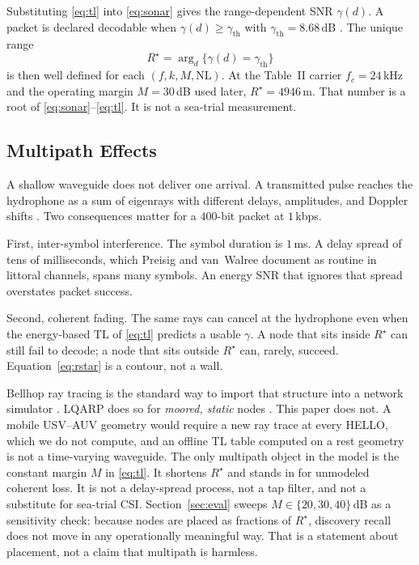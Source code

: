 \documentclass[journal]{IEEEtran}
\begin{document}
Substituting \eqref{eq:tl} into \eqref{eq:sonar} gives the
range-dependent SNR $\gamma(d)$.
A packet is declared decodable when
$\gamma(d)\ge\gamma_{\mathrm{th}}$ with
$\gamma_{\mathrm{th}}=8.68$\,dB \cite{liu2026lqarp}.
The unique range
\begin{equation}
R^{\star}=\arg_{d}\bigl\{\gamma(d)=\gamma_{\mathrm{th}}\bigr\}
\label{eq:rstar}
\end{equation}
is then well defined for each $(f,k,M,\mathrm{NL})$.
At the Table~II carrier $f_{c}=24$\,kHz and the operating margin
$M=30$\,dB used later, $R^{\star}=4946$\,m.
That number is a root of \eqref{eq:sonar}--\eqref{eq:tl}. It is not
a sea-trial measurement.

\subsection{Multipath Effects}
\label{sec:multipath}

A shallow waveguide does not deliver one arrival.
A transmitted pulse reaches the hydrophone as a sum of eigenrays
with different delays, amplitudes, and Doppler shifts
\cite{preisig2007propagation,vanwalree2013scattering}.
Two consequences matter for a $400$-bit packet at $1$\,kbps.

First, inter-symbol interference.
The symbol duration is $1$\,ms. A delay spread of tens of
milliseconds, which Preisig and van~Walree document as routine in
littoral channels, spans many symbols.
An energy SNR that ignores that spread overstates packet success.

Second, coherent fading.
The same rays can cancel at the hydrophone even when the
energy-based $\mathrm{TL}$ of \eqref{eq:tl} predicts a usable
$\gamma$. A node that sits inside $R^{\star}$ can still fail to
decode; a node that sits outside $R^{\star}$ can, rarely, succeed.
Equation~\eqref{eq:rstar} is a contour, not a wall.

Bellhop ray tracing is the standard way to import that structure
into a network simulator \cite{porter2011bellhop}.
LQARP does so for \emph{moored, static} nodes \cite{liu2026lqarp}.
This paper does not.
A mobile USV--AUV geometry would require a new ray trace at every
HELLO, which we do not compute, and an offline TL table computed on
a rest geometry is not a time-varying waveguide.
The only multipath object in the model is the constant margin $M$
in \eqref{eq:tl}.
It shortens $R^{\star}$ and stands in for unmodeled coherent loss.
It is not a delay-spread process, not a tap filter, and not a
substitute for sea-trial CSI.
Section~\ref{sec:eval} sweeps $M\in\{20,30,40\}$\,dB as a
sensitivity check: because nodes are placed as fractions of
$R^{\star}$, discovery recall does not move in any operationally
meaningful way.
That is a statement about placement, not a claim that multipath is
harmless.
\end{document}
